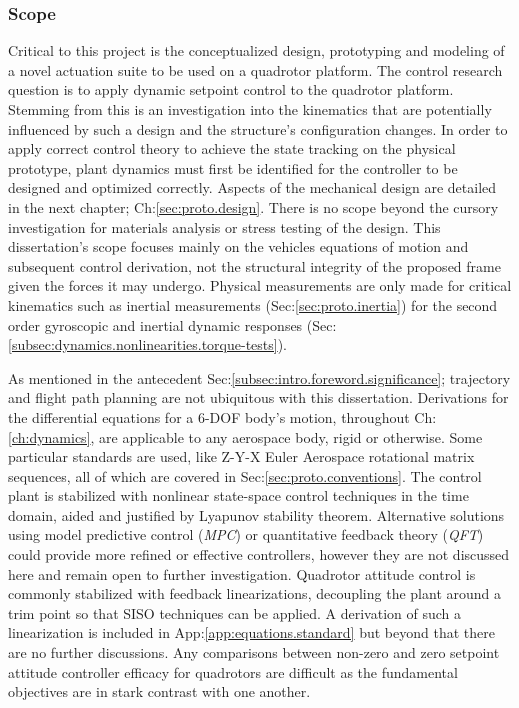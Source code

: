 \subsubsection{Scope}
\label{subsubsec:intro.foreword.scope}
Critical to this project is the conceptualized design, prototyping and modeling of a novel actuation suite to be used on a quadrotor platform. The control research question is to apply dynamic setpoint control to the quadrotor platform. Stemming from this is an investigation into the kinematics that are potentially influenced by such a design and the structure's configuration changes. In order to apply correct control theory to achieve the state tracking on the physical prototype, plant dynamics must first be identified for the controller to be designed and optimized correctly. Aspects of the mechanical design are detailed in the next chapter; Ch:\ref{sec:proto.design}. There is no scope beyond the cursory investigation for materials analysis or stress testing of the design. This dissertation's scope focuses mainly on the vehicles equations of motion and subsequent control derivation, not the structural integrity of the proposed frame given the forces it may undergo. Physical measurements are only made for critical kinematics such as inertial measurements (Sec:\ref{sec:proto.inertia}) for the second order gyroscopic and inertial dynamic responses (Sec:\ref{subsec:dynamics.nonlinearities.torque-tests}).
\par
As mentioned in the antecedent Sec:\ref{subsec:intro.foreword.significance}; trajectory and flight path planning are not ubiquitous with this dissertation. Derivations for the differential equations for a 6-DOF body's motion, throughout Ch:\ref{ch:dynamics}, are applicable to any aerospace body, rigid or otherwise. Some particular standards are used, like Z-Y-X Euler Aerospace rotational matrix sequences, all of which are covered in Sec:\ref{sec:proto.conventions}. The control plant is stabilized with nonlinear state-space control techniques in the time domain, aided and justified by Lyapunov stability theorem\cite{noteonlyapunov,nonlinearsystems,bojelayupanov}. Alternative solutions using model predictive control (\emph{MPC}) or quantitative feedback theory (\emph{QFT}) could provide more refined or effective controllers, however they are not discussed here and remain open to further investigation. Quadrotor attitude control is commonly stabilized with feedback linearizations, decoupling the plant around a trim point so that SISO techniques can be applied. A derivation of such a linearization is included in App:\ref{app:equations.standard} but beyond that there are no further discussions. Any comparisons between non-zero and zero setpoint attitude controller efficacy for quadrotors are difficult as the fundamental objectives are in stark contrast with one another.

